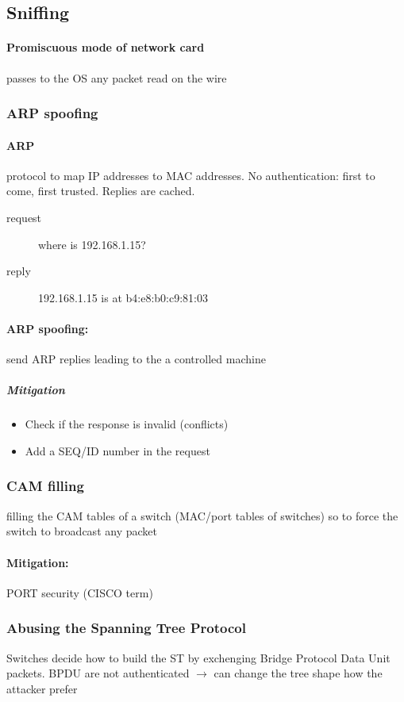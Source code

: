 \documentclass{article}
\begin{document}
\subsection{Sniffing}
\paragraph{Promiscuous mode of network card} passes to the OS any packet read on the wire
\subsubsection{ARP spoofing} 
\paragraph{ARP} protocol to map IP addresses to MAC addresses. No authentication: first to come, first trusted. Replies are cached.
\begin{description}
\item[request] where is 192.168.1.15?
\item[reply] 192.168.1.15 is at b4:e8:b0:c9:81:03
\end{description}
\paragraph{ARP spoofing:} send ARP replies leading to the a controlled machine
\subparagraph{Mitigation}
\begin{itemize}
\item Check if the response is invalid (conflicts)
\item Add a SEQ/ID number in the request
\end{itemize}
\subsubsection{CAM filling} filling the CAM tables of a switch (MAC/port tables of switches) so to force the switch to broadcast any packet
\paragraph{Mitigation:} PORT security (CISCO term)

\subsubsection{Abusing the Spanning Tree Protocol}
Switches decide how to build the ST by exchenging Bridge Protocol Data Unit packets. BPDU are not authenticated $\rightarrow$ can change the tree shape how the attacker prefer
\end{document}
